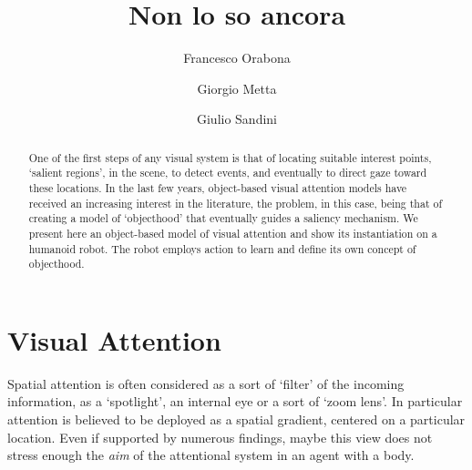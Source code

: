 \documentclass{llncs}
\makeatletter
\DeclareRobustCommand\onedot{\futurelet\@let@token\@onedot}
\def\@onedot{\ifx\@let@token.\else.\null\fi\xspace}
\def\etal{\emph{et al}\onedot}
\makeatother
\begin{document}
\mainmatter

\title{Non lo so ancora}

\author{Francesco Orabona \and Giorgio Metta \and Giulio Sandini}


\maketitle

\begin{abstract}
One of the first
steps of any visual system is that of
locating suitable interest points, `salient regions', in
the scene, to detect events, and eventually to direct
gaze toward these locations. In the last few years,
object-based visual attention models have received an
increasing interest in the literature, the problem, in
this case, being that of creating a model of
`objecthood' that eventually guides a saliency
mechanism. We present here an object-based model of
visual attention and show its instantiation on a
humanoid robot. The robot employs action to learn
and define its own concept of objecthood.
\end{abstract}

\section{Visual Attention\label{attention}}

Spatial attention is often considered as a sort of `filter'
of the incoming information, as a `spotlight',
an internal eye or a sort of `zoom lens'. In particular attention is
believed to be deployed as a spatial gradient, centered on a particular location.
Even if supported by numerous findings, maybe this view does not
stress enough the \emph{aim} of the attentional system in an agent with a body.
\end{document}
